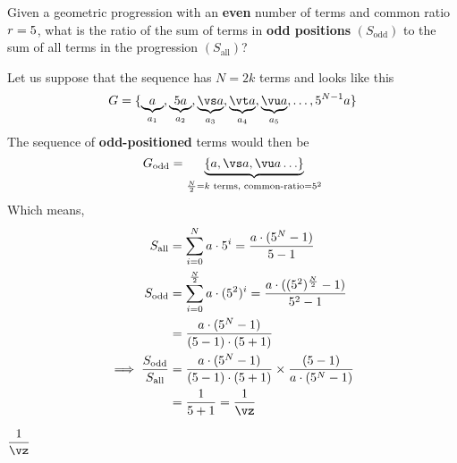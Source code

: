 

\SQUARE\vr\vs
\MULTIPLY\vs\vr\vt
\MULTIPLY\vt\vr\vu
\ADD{}\vz

\question[4] Given a geometric progression with an \textbf{even} number of terms 
and common ratio $r=5$, what is the ratio of the sum of terms in \textbf{odd positions} 
$(S_\text{odd})$ to the sum of all terms in the progression $(S_\text{all})$?

\watchout

\begin{solution}[\halfpage]
  Let us suppose that the sequence has $N=2k$ terms and looks like this 
  \[ G = \lbrace 
          \underbrace{a}_{a_1},
          \underbrace{\vr a}_{a_2},
          \underbrace{\vs a}_{a_3},
          \underbrace{\vt a}_{a_4}, 
          \underbrace{\vu a}_{a_5}, 
          \ldots, \vr^{N-1} a
          \rbrace \]
  The sequence of \textbf{odd-positioned} terms would then be 
  \[ G_{\text{odd}} = \underbrace{\lbrace a,\vs a, \vu a \ldots \rbrace}_{\frac{N}{2} = k\text{ terms, common-ratio=} \vr^2 } \]
  Which means, 
  \begin{align}
    S_{\text{all}} &= \sum_{i=0}^N a\cdot\vr^{i} = \dfrac{a\cdot (\vr^N - 1)}{\vr - 1} \\
    S_{\text{odd}} &= \sum_{i=0}^{\frac{N}{2}} a\cdot(\vr^2)^i = \dfrac{a\cdot ((\vr^2)^{\frac{N}{2}} - 1)}{\vr^2 - 1} \\
                   &= \dfrac{a\cdot(\vr^N - 1)}{(\vr-1)\cdot(\vr +1)} \\
    \implies\dfrac{S_\text{odd}}{S_\text{all}} &= \dfrac{a\cdot(\vr^N-1)}{(\vr - 1)\cdot(\vr + 1)}\times
                                                  \dfrac{(\vr - 1)}{a\cdot(\vr^N-1)} \\
                                                  &= \dfrac{1}{\vr + 1} = \dfrac{1}\vz
   \end{align}
\end{solution}
\ifprintanswers\begin{codex}$\dfrac{1}\vz$\end{codex}\fi
